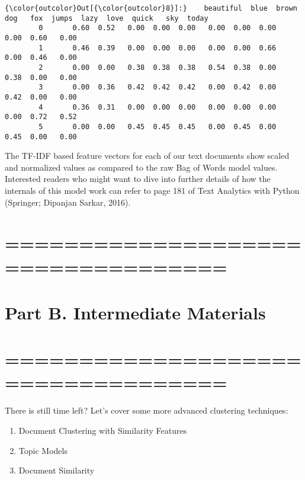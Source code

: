 \documentclass[11pt]{article}
\providecommand{\tightlist}{%
      \setlength{\itemsep}{0pt}\setlength{\parskip}{0pt}}
\begin{document}
\begin{Verbatim}[commandchars=\\\{\}]
{\color{outcolor}Out[{\color{outcolor}8}]:}    beautiful  blue  brown   dog   fox  jumps  lazy  love  quick   sky  today
        0       0.60  0.52   0.00  0.00  0.00   0.00  0.00  0.00   0.00  0.60   0.00
        1       0.46  0.39   0.00  0.00  0.00   0.00  0.00  0.66   0.00  0.46   0.00
        2       0.00  0.00   0.38  0.38  0.38   0.54  0.38  0.00   0.38  0.00   0.00
        3       0.00  0.36   0.42  0.42  0.42   0.00  0.42  0.00   0.42  0.00   0.00
        4       0.36  0.31   0.00  0.00  0.00   0.00  0.00  0.00   0.00  0.72   0.52
        5       0.00  0.00   0.45  0.45  0.45   0.00  0.45  0.00   0.45  0.00   0.00
\end{Verbatim}
            
    The TF-IDF based feature vectors for each of our text documents show
scaled and normalized values as compared to the raw Bag of Words model
values. Interested readers who might want to dive into further details
of how the internals of this model work can refer to page 181 of Text
Analytics with Python (Springer\Apress; Dipanjan Sarkar, 2016).

    \hypertarget{section}{%
\section{===================================}\label{section}}

\hypertarget{part-b.-intermediate-materials}{%
\section{Part B. Intermediate
Materials}\label{part-b.-intermediate-materials}}

\hypertarget{section-1}{%
\section{===================================}\label{section-1}}

    There is still time left? Let's cover some more advanced clustering
techniques:

\begin{enumerate}
\def\labelenumi{\arabic{enumi}.}
\tightlist
\item
  Document Clustering with Similarity Features
\item
  Topic Models
\item
  Document Similarity
\end{enumerate}
\end{document}
